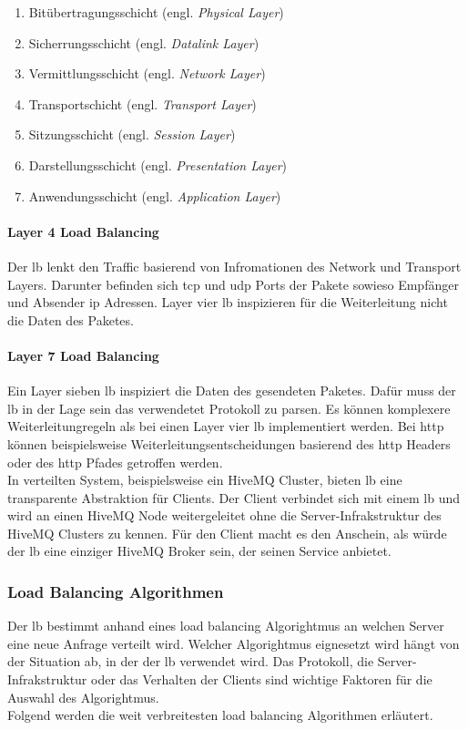 \begin{enumerate}
    \item Bitübertragungsschicht (engl. \textit{Physical Layer})
    \item Sicherrungsschicht (engl. \textit{Datalink Layer})
    \item Vermittlungsschicht (engl. \textit{Network Layer})
    \item Transportschicht (engl. \textit{Transport Layer})
    \item Sitzungsschicht (engl. \textit{Session Layer})
    \item Darstellungsschicht (engl. \textit{Presentation Layer})
    \item Anwendungsschicht (engl. \textit{Application Layer})
\end{enumerate}
\cite{WhatOSIModel}
\paragraph{Layer 4 Load Balancing}
Der \ac{lb} lenkt den Traffic basierend von Infromationen des Network und Transport Layers. Darunter befinden sich \ac{tcp} und \ac{udp} Ports der Pakete sowieso Empfänger und Absender \ac{ip} Adressen. Layer vier \ac{lb} inspizieren für die Weiterleitung nicht die Daten des Paketes.
\cite{WhatLoadBalancer}

\paragraph{Layer 7 Load Balancing}
Ein Layer sieben \ac{lb} inspiziert die Daten des gesendeten Paketes. Dafür muss der \ac{lb} in der Lage sein das verwendetet Protokoll zu parsen. Es können komplexere Weiterleitungregeln als bei einen Layer vier \ac{lb} implementiert werden. Bei \ac{http} können beispielsweise Weiterleitungsentscheidungen basierend des \ac{http} Headers oder des \ac{http} Pfades getroffen werden.
\cite{WhatLoadBalancer}
\\
In verteilten System, beispielsweise ein HiveMQ Cluster, bieten \ac{lb} eine transparente Abstraktion für Clients. Der Client verbindet sich mit einem \ac{lb} und wird an einen HiveMQ Node weitergeleitet ohne die Server-Infrakstruktur des HiveMQ Clusters zu kennen. Für den Client macht es den Anschein, als würde der \ac{lb} eine einziger HiveMQ Broker sein, der seinen Service anbietet.

\subsubsection{Load Balancing Algorithmen} \label{sb:lb-algo}
Der \acl{lb} bestimmt anhand eines load balancing Algorightmus an welchen Server eine neue Anfrage verteilt wird.
Welcher Algorightmus eignesetzt wird hängt von der Situation ab, in der der \ac{lb} verwendet wird.
Das Protokoll, die Server-Infrakstruktur oder das Verhalten der Clients sind wichtige Faktoren für die Auswahl des Algorightmus.
\\
Folgend werden die weit verbreitesten load balancing Algorithmen erläutert.

